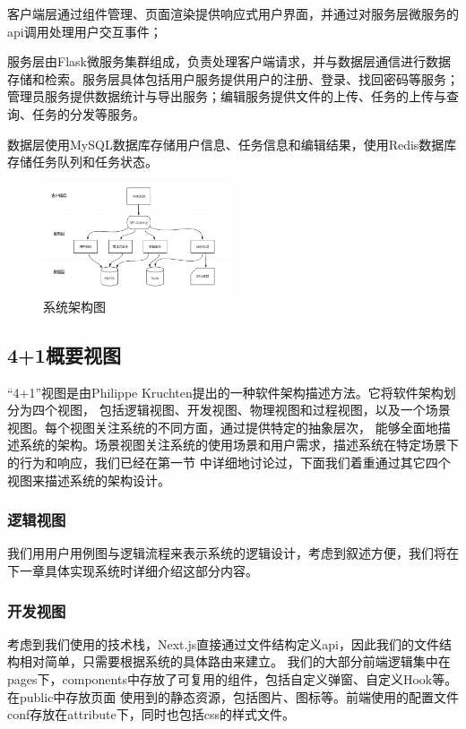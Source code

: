 客户端层通过组件管理、页面渲染提供响应式用户界面，并通过对服务层微服务的api调用处理用户交互事件；

服务层由Flask微服务集群组成，负责处理客户端请求，并与数据层通信进行数据存储和检索。服务层具体包括用户服务提供用户的注册、登录、找回密码等服务；
管理员服务提供数据统计与导出服务；编辑服务提供文件的上传、任务的上传与查询、任务的分发等服务。

数据层使用MySQL数据库存储用户信息、任务信息和编辑结果，使用Redis数据库存储任务队列和任务状态。

\begin{figure}[ht]
    \centering
    \includegraphics[width=0.5\textwidth]{source/img/system_structure.png}
    \caption{系统架构图}
    \label{fig:system-structure}
\end{figure}

\subsection{4+1概要视图}

“4+1”视图是由Philippe Kruchten提出的一种软件架构描述方法\cite{kruchten20024+}。它将软件架构划分为四个视图，
包括逻辑视图、开发视图、物理视图和过程视图，以及一个场景视图。每个视图关注系统的不同方面，通过提供特定的抽象层次，
能够全面地描述系统的架构。场景视图关注系统的使用场景和用户需求，描述系统在特定场景下的行为和响应，我们已经在第一节
中详细地讨论过，下面我们着重通过其它四个视图来描述系统的架构设计。

\subsubsection{逻辑视图}

我们用用户用例图与逻辑流程来表示系统的逻辑设计，考虑到叙述方便，我们将在下一章具体实现系统时详细介绍这部分内容。

\subsubsection{开发视图}

考虑到我们使用的技术栈，Next.js直接通过文件结构定义api，因此我们的文件结构相对简单，只需要根据系统的具体路由来建立。
我们的大部分前端逻辑集中在pages下，components中存放了可复用的组件，包括自定义弹窗、自定义Hook等。在public中存放页面
使用到的静态资源，包括图片、图标等。前端使用的配置文件conf存放在attribute下，同时也包括css的样式文件。

